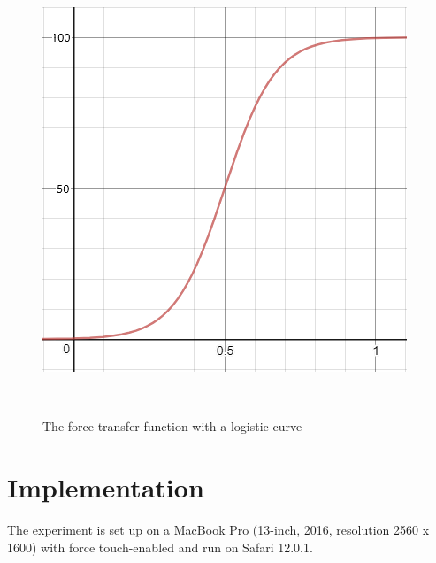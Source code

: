 \documentclass{sigchi}
\begin{document}
\begin{figure}[!h]
    \centering
    \includegraphics[width=0.8\columnwidth]{figures/Capture1}
    \caption{The force transfer function with a logistic curve}~\label{fig:figure2}
\end{figure}




\section{Implementation} 

%
%
The experiment is set up on a MacBook Pro (13-inch, 2016, resolution 2560 x 1600) with force touch-enabled and run on Safari 12.0.1.
\end{document}
